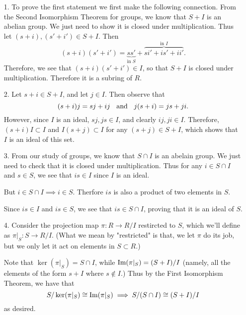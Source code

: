     \begin{prf}
        \begin{itemize}
            \item[1.] To prove the first statement we first make
            the following connection. From the Second Isomorphism
            Theorem for groups, we know that $S + I$ is an abelian
            group. We just need to show it is closed under
            multiplication. Thus let $(s + i), (s' + i') \in S +
            I$. Then 
            \[
                (s + i)(s' + i') = \underbrace{ss'}_{\text{in }S} + \overbrace{si' + is' + ii'}^{\text{in } I}.
            \]
            Therefore, we see that $(s + i)(s' + i') \in I$, so
            that $S + I$ is closed under multiplication. Therefore
            it is a subring of $R$. 

            \item[2.] Let $s + i \in S + I$, and let $j \in I$. Then observe that 
            \[
                (s + i)j = sj + ij \hspace{0.2cm}\text{ and }\hspace{0.2cm} j(s + i) = js + ji.
            \] 
            However, since $I$ is an ideal, $sj, js \in I$, and
            clearly $ij, ji \in I$. Therefore, $(s + i)I \subset
            I$ and $I(s + j) \subset I$ for any $(s + j) \in S +
            I$, which shows that $I$ is an ideal of this set.
            
            \item[3.] From our study of groups, we know that $S
            \cap I$ is an abelain group. We just need to check
            that it is closed under multiplication. Thus for any
            $i \in S \cap I$ and $s \in S$, we see that $is \in I$
            since $I$ is an ideal. 
            
            But $i \in S \cap I \implies i
            \in S$. Therfore $is$ is also a product of two
            elements in $S$.

            Since $is \in I$ and $is \in S$, we see that $is \in S
            \cap I$, proving that it is an ideal of $S$.

            \item[4.] Consider the projection map $\pi: R \to R/I$
            restircted to $S$, which we'll define as $\pi|_S : S
            \to R/I$. (What we mean by "restricted" is that, we
            let $\pi$ do its job, but we only let it act on
            elements in $S \subset R$.)

            Note that $\ker(\pi|_S) = S \cap I$, while
            $\mbox{Im}(\pi|_S) = (S + I)/I$ (namely, all the elements of
            the form $s + I$ where $s \not\in I$.) Thus by the
            First Isomorphism Theorem, we have that 
            \[
                S/\ker(\pi|_S) \cong \mbox{Im}(\pi|_S)  
                \implies S/(S \cap I) \cong (S + I)/I 
            \]
            as desired.
        \end{itemize}
    \end{prf}

